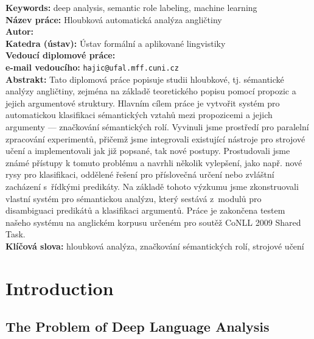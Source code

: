 \documentclass[12pt,notitlepage]{report}
\begin{document}
\noindent \textbf{Keywords:} deep analysis, semantic role labeling, machine learning \\ 

\bigskip
{}
\noindent
\textbf{Název práce:} Hloubková automatická analýza angličtiny\\
\textbf{Autor:} \theauthor\\
\textbf{Katedra (ústav):} Ústav formální a aplikované lingvistiky\\
\textbf{Vedoucí diplomové práce:} \thesupervisor\\
\textbf{e-mail vedoucího:} \texttt{hajic@ufal.mff.cuni.cz}\\

\noindent \textbf{Abstrakt:} Tato diplomová práce popisuje studii hloubkové, tj. sémantické analýzy angličtiny, zejména na základě teoretického popisu pomocí propozic a jejich argumentové struktury. Hlavním cílem práce je vytvořit systém pro automatickou klasifikaci sémantických vztahů mezi propozicemi a jejich argumenty --- značkování sémantických rolí. Vyvinuli jsme prostředí pro paralelní zpracování experimentů, přičemž jsme integrovali existující nástroje pro strojové učení a implementovali jak již popsané, tak nové postupy. Prostudovali jsme známé přístupy k tomuto problému a navrhli několik vylepšení, jako např. nové rysy pro klasifikaci, oddělené řešení pro příslovečná určení nebo zvláštní zacházení s~řídkými predikáty. Na základě tohoto výzkumu jsme zkonstruovali vlastní systém pro sémantickou analýzu, který sestává z~modulů pro disambiguaci predikátů a klasifikaci argumentů. Práce je zakončena testem našeho systému na anglickém korpusu určeném pro soutěž CoNLL 2009 Shared Task. \\

\noindent \textbf{Klíčová slova:} hloubková analýza, značkování sémantických rolí, strojové učení

\cleardoublepage

%
%
\chapter{Introduction}\label{intro}
%
%

\section{The Problem of Deep Language Analysis}\label{problem}
\end{document}
